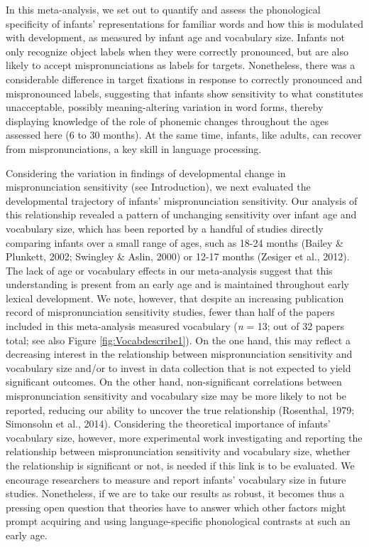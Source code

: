 \documentclass[
  english,
  man, noextraspace]{apa6}
\begin{document}
In this meta-analysis, we set out to quantify and assess the phonological specificity of infants' representations for familiar words and how this is modulated with development, as measured by infant age and vocabulary size. Infants not only recognize object labels when they were correctly pronounced, but are also likely to accept mispronunciations as labels for targets. Nonetheless, there was a considerable difference in target fixations in response to correctly pronounced and mispronounced labels, suggesting that infants show sensitivity to what constitutes unacceptable, possibly meaning-altering variation in word forms, thereby displaying knowledge of the role of phonemic changes throughout the ages assessed here (6 to 30 months). At the same time, infants, like adults, can recover from mispronunciations, a key skill in language processing.

Considering the variation in findings of developmental change in mispronunciation sensitivity (see Introduction), we next evaluated the developmental trajectory of infants' mispronunciation sensitivity. Our analysis of this relationship revealed a pattern of unchanging sensitivity over infant age and vocabulary size, which has been reported by a handful of studies directly comparing infants over a small range of ages, such as 18-24 months (Bailey \& Plunkett, 2002; Swingley \& Aslin, 2000) or 12-17 months (Zesiger et al., 2012). The lack of age or vocabulary effects in our meta-analysis suggest that this understanding is present from an early age and is maintained throughout early lexical development. We note, however, that despite an increasing publication record of mispronunciation sensitivity studies, fewer than half of the papers included in this meta-analysis measured vocabulary (\emph{n} = 13; out of 32 papers total; see also Figure \ref{fig:Vocabdescribe1}). On the one hand, this may reflect a decreasing interest in the relationship between mispronunciation sensitivity and vocabulary size and/or to invest in data collection that is not expected to yield significant outcomes. On the other hand, non-significant correlations between mispronunciation sensitivity and vocabulary size may be more likely to not be reported, reducing our ability to uncover the true relationship (Rosenthal, 1979; Simonsohn et al., 2014). Considering the theoretical importance of infants' vocabulary size, however, more experimental work investigating and reporting the relationship between mispronunciation sensitivity and vocabulary size, whether the relationship is significant or not, is needed if this link is to be evaluated. We encourage researchers to measure and report infants' vocabulary size in future studies. Nonetheless, if we are to take our results as robust, it becomes thus a pressing open question that theories have to answer which other factors might prompt acquiring and using language-specific phonological contrasts at such an early age.
\end{document}

